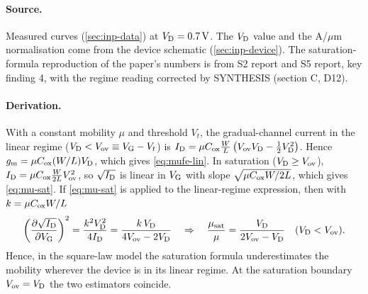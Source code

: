\paragraph{Source.}
Measured curves  (\cref{sec:inp-data}) at $V_{\mathrm{D}}=\SI{0.7}{V}$. The $V_{\mathrm{D}}$ value and the A/$\mu$m normalisation come from the device schematic (\cref{sec:inp-device}). The saturation-formula reproduction of the paper's numbers is from S2 report and S5 report, key finding 4, with the regime reading corrected by SYNTHESIS (section C, D12).

\paragraph{Derivation.}
\begin{derivation}
With a constant mobility $\mu$ and threshold $V_t$, the gradual-channel current in the linear regime ($V_{\mathrm{D}} < V_{\mathrm{ov}}\equiv V_{\mathrm{G}}-V_t$) is
$I_{\mathrm{D}} = \mu C_{\mathrm{ox}}\frac{W}{L}\left(V_{\mathrm{ov}}V_{\mathrm{D}} - \tfrac12V_{\mathrm{D}}^{2}\right)$. Hence $g_{\mathrm{m}}=\mu C_{\mathrm{ox}}(W/L)V_{\mathrm{D}}$, which gives \cref{eq:mufe-lin}. In saturation ($V_{\mathrm{D}}\ge V_{\mathrm{ov}}$), $I_{\mathrm{D}}=\mu C_{\mathrm{ox}}\frac{W}{2L}V_{\mathrm{ov}}^{2}$, so $\sqrt{I_{\mathrm{D}}}$ is linear in $V_{\mathrm{G}}$ with slope $\sqrt{\mu C_{\mathrm{ox}} W/2L}$, which gives \cref{eq:mu-sat}. If \cref{eq:mu-sat} is applied to the linear-regime expression, then with $k=\mu C_{\mathrm{ox}} W/L$
\begin{equation}
  \left(\frac{\partial\sqrt{I_{\mathrm{D}}}}{\partial V_{\mathrm{G}}}\right)^{2} = \frac{k^{2}V_{\mathrm{D}}^{2}}{4I_{\mathrm{D}}}
  = \frac{k\,V_{\mathrm{D}}}{4V_{\mathrm{ov}}-2V_{\mathrm{D}}}
  \quad\Rightarrow\quad
  \frac{\mu_{\mathrm{sat}}}{\mu} = \frac{V_{\mathrm{D}}}{2V_{\mathrm{ov}}-V_{\mathrm{D}}}\quad(V_{\mathrm{D}}<V_{\mathrm{ov}}).
  \label{eq:d2-musat-ratio}
\end{equation}
Hence, in the square-law model the saturation formula underestimates the mobility wherever the device is in its linear regime. At the saturation boundary $V_{\mathrm{ov}}=V_{\mathrm{D}}$ the two estimators coincide.
\end{derivation}

